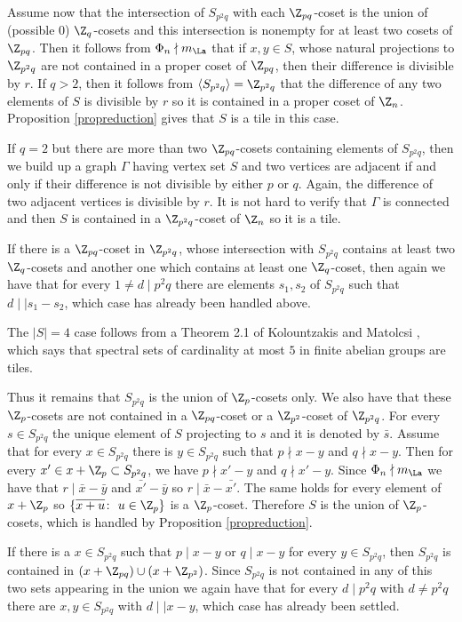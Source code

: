         Assume now that the intersection of $S_{p^2q}$ with each $\Z_{pq}$-coset is the union of (possible 0) $\Z_q$-cosets and this intersection is nonempty for at least two cosets of $\Z_{pq}$. 
        Then it follows from $\Phi_n \nmid m_{\La}$ that if $x,y \in S$, whose natural projections to $\Z_{p^2q}$ are not contained in a proper coset of $\Z_{pq}$, then their difference is divisible by $r$. If $q>2$, then it follows from $\langle S_{p^2q}\rangle=\Z_{p^2q}$ that the difference of any two elements of $S$ is divisible by $r$ so it is contained in a proper coset of $\Z_n$. Proposition \ref{propreduction} gives that $S$ is a tile in this case. 
        
        If $q=2$ but there are more than two $\Z_{pq}$-cosets containing elements of $S_{p^2q}$, then we build up a graph $\Gamma$ having vertex set $S$ and two vertices are adjacent if and only if their difference is not divisible by either $p$ or $q$. Again, the difference of two adjacent vertices is divisible by $r$. It is not hard to verify that $\Gamma $ is connected 
        and then $S$ is contained in a $\Z_{p^2q}$-coset of $\Z_n$ so it is a tile. 
        
        If there is a 
        $\Z_{pq}$-coset in $\Z_{p^2q}$, whose intersection with $S_{p^2q}$ contains at least two $\Z_{q}$-cosets and another one which contains at least one $\Z_{q}$-coset, then again we have that for every $1 \ne d \mid p^2q$ there are elements $s_1,s_2$ of $S_{p^2q}$ such that $d \mid \mid s_1-s_2$, which case has already been handled above. 
        
        The $|S|=4$ case follows from a Theorem 2.1 of Kolountzakis and Matolcsi \cite{KMkishalmaz}, which says that spectral sets of cardinality at most $5$  in finite abelian groups are tiles.
        
        
        Thus it remains that $S_{p^2q} $ is the union of $\Z_p$-cosets only. We also have that these $\Z_p$-cosets are not contained in a $\Z_{pq}$-coset or a $\Z_{p^2}$-coset of $\Z_{p^2q}$. 
        For every $s \in S_{p^2q}$ the unique element of $S$ projecting to $s$ and it is denoted by $\bar{s}$.
        Assume that for every $x \in S_{p^2q}$ there is $y \in S_{p^2q}$ such that $p \nmid x-y$ and $q \nmid x-y$. Then for every $x' \in x+\Z_p \subset S_{p^2q}$, we have $p \nmid x'-y$ and $q \nmid x'-y$. Since $\Phi_n \nmid m_{\La}$ we have that $r \mid \bar{x}-\bar{y}$ and $\bar{x'}-\bar{y}$ so $r \mid \bar{x}-\bar{x'}$.
        The same holds for every element of $x+\Z_p$ so $\{ \overline{x+u}  \colon~ u \in \Z_p \}$ is a $\Z_p$-coset. Therefore $S$ is the union of $\Z_p$-cosets, which is handled by Proposition \ref{propreduction}.
        
        If there is a $x \in S_{p^2q}$ such that $p \mid x-y$ or $q \mid x-y$ for every $y \in S_{p^2q}$, then $S_{p^2q}$ is contained in $(x+\Z_{pq}) \cup (x+\Z_{p^2})$. Since $S_{p^2q}$ is not contained in any of this two sets appearing in the union we again have that for every $d \mid p^2q$ with $d \ne p^2q$ there are $x,y \in S_{p^2q}$ with $d \mid \mid x-y$, which case has already been settled.   
